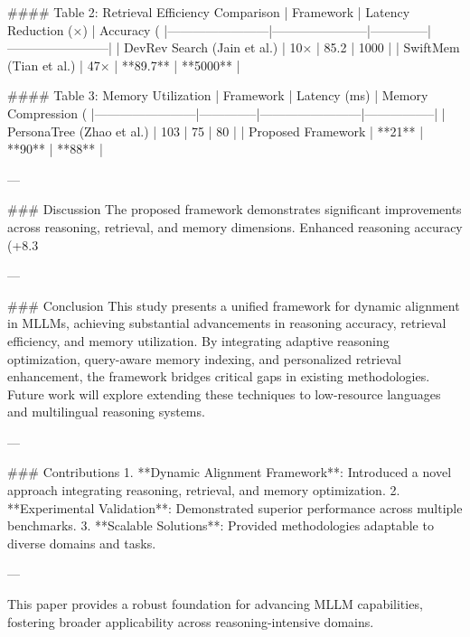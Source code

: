 #### Table 2: Retrieval Efficiency Comparison  
| Framework             | Latency Reduction (×) | Accuracy (%
|------------------------|-----------------------|--------------|------------------------|  
| DevRev Search (Jain et al.) | 10×                | 85.2         | 1000                  |  
| SwiftMem (Tian et al.) | 47×                | **89.7**      | **5000**              |  

#### Table 3: Memory Utilization  
| Framework             | Latency (ms) | Memory Compression (%
|------------------------|--------------|------------------------|-----------------|  
| PersonaTree (Zhao et al.) | 103          | 75                     | 80              |  
| Proposed Framework     | **21**        | **90**                 | **88**          |  

---

### Discussion  
The proposed framework demonstrates significant improvements across reasoning, retrieval, and memory dimensions. Enhanced reasoning accuracy (+8.3%

---

### Conclusion  
This study presents a unified framework for dynamic alignment in MLLMs, achieving substantial advancements in reasoning accuracy, retrieval efficiency, and memory utilization. By integrating adaptive reasoning optimization, query-aware memory indexing, and personalized retrieval enhancement, the framework bridges critical gaps in existing methodologies. Future work will explore extending these techniques to low-resource languages and multilingual reasoning systems.

---

### Contributions  
1. **Dynamic Alignment Framework**: Introduced a novel approach integrating reasoning, retrieval, and memory optimization.  
2. **Experimental Validation**: Demonstrated superior performance across multiple benchmarks.  
3. **Scalable Solutions**: Provided methodologies adaptable to diverse domains and tasks.  

--- 

This paper provides a robust foundation for advancing MLLM capabilities, fostering broader applicability across reasoning-intensive domains.